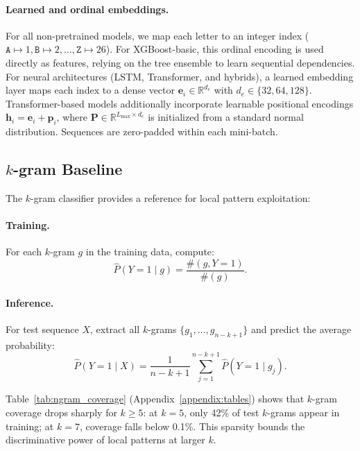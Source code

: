 \documentclass{article}
\theoremstyle{plain}
\theoremstyle{definition}
\theoremstyle{remark}
\begin{document}
\paragraph{Learned and ordinal embeddings.}
For all non-pretrained models, we map each letter to an integer index ($\texttt{A} \mapsto 1, \texttt{B} \mapsto 2, \ldots, \texttt{Z} \mapsto 26$). For XGBoost-basic, this ordinal encoding is used directly as features, relying on the tree ensemble to learn sequential dependencies. For neural architectures (LSTM, Transformer, and hybrids), a learned embedding layer maps each index to a dense vector $\mathbf{e}_i \in \mathbb{R}^{d_e}$ with $d_e \in \{32, 64, 128\}$. Transformer-based models additionally incorporate learnable positional encodings $\mathbf{h}_i = \mathbf{e}_i + \mathbf{p}_i$, where $\mathbf{P} \in \mathbb{R}^{L_{\max} \times d_e}$ is initialized from a standard normal distribution. Sequences are zero-padded within each mini-batch.

\subsection{$k$-gram Baseline}
\label{subsec:kgram}

The $k$-gram classifier provides a reference for local pattern exploitation:

\paragraph{Training.} For each $k$-gram $g$ in the training data, compute:
\begin{equation}
\hat{P}(Y=1 \mid g) = \frac{\#(g, Y=1)}{\#(g)}.
\end{equation}

\paragraph{Inference.} For test sequence $X$, extract all $k$-grams $\{g_1, \ldots, g_{n-k+1}\}$ and predict the average probability:
\begin{equation}
\hat{P}(Y=1 \mid X) = \frac{1}{n-k+1} \sum_{j=1}^{n-k+1} \hat{P}(Y=1 \mid g_j).
\end{equation}

Table~\ref{tab:ngram_coverage} (Appendix~\ref{appendix:tables}) shows that $k$-gram coverage drops sharply for $k \geq 5$: at $k=5$, only 42\% of test $k$-grams appear in training; at $k=7$, coverage falls below 0.1\%. This sparsity bounds the discriminative power of local patterns at larger $k$.
\end{document}
